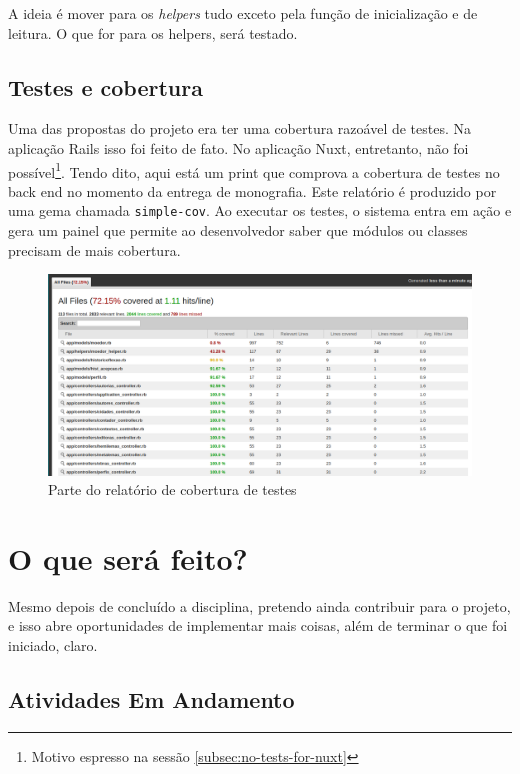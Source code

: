 A ideia é mover para os \emph{helpers} tudo exceto pela função de inicialização e de leitura. O que for para os helpers,
será testado.

\subsection{Testes e cobertura}
\label{subsec:testes-cobertura}

Uma das propostas do projeto era ter uma cobertura razoável de testes. Na aplicação Rails isso foi feito de fato. No
aplicação Nuxt, entretanto, não foi possível\footnote{Motivo espresso na sessão \ref{subsec:no-tests-for-nuxt}}. Tendo
dito, aqui está um print que comprova a cobertura de testes no back end no momento da entrega de monografia. Este
relatório é produzido por uma gema chamada \texttt{simple-cov}. Ao executar os testes, o sistema entra em ação e gera um
painel que permite ao desenvolvedor saber que módulos ou classes precisam de mais cobertura.

\begin{figure}[htb]
  \centering
  \includegraphics[width=.9\textwidth]{figuras/test_coverage.png}
  \caption{Parte do relatório de cobertura de testes}
  \label{fig:test-coverage}
\end{figure}

\section{O que será feito?}
\label{sec:what-will-be-done}

Mesmo depois de concluído a disciplina, pretendo ainda contribuir para o projeto, e isso abre oportunidades de implementar
mais coisas, além de terminar o que foi iniciado, claro.

\subsection{Atividades Em Andamento}\label{subsec:ongoing}

